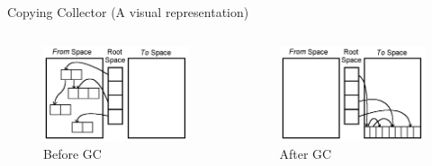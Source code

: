 \documentclass[
  10pt,
  ignorenonframetext,
]{beamer}
\begin{document}
\begin{frame}{Copying Collector (A visual
representation)}
\protect\hypertarget{copying-collector-a-visual-representation}{}
\pause

\begin{columns}[T]
\begin{column}{0.48\textwidth}
\begin{figure}
\centering
\includegraphics[width=1\textwidth,height=\textheight]{images/copying_collector_before.png}
\caption{Before GC}
\end{figure}
\end{column}

\pause

\begin{column}{0.48\textwidth}
\begin{figure}
\centering
\includegraphics[width=1\textwidth,height=\textheight]{images/copying_collector_after.png}
\caption{After GC}
\end{figure}
\end{column}
\end{columns}
\end{frame}
\end{document}
